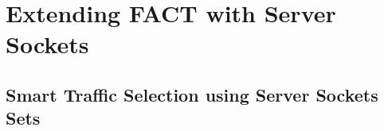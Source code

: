 
\chapter{Extending FACT with Server Sockets\label{chapter:integration}}

\section{Smart Traffic Selection using Server Sockets Sets}


